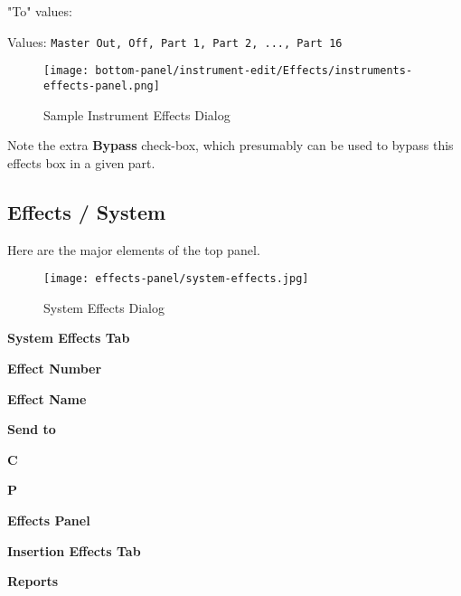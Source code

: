    "To" values:

   Values: \texttt{Master Out, Off, Part 1, Part 2, ..., Part 16}


\begin{figure}[H]
   \centering 
   \texttt{[image: bottom-panel/instrument-edit/Effects/instruments-effects-panel.png]}
   \caption{Sample Instrument Effects Dialog}
   \label{fig:sample_instrument_effects_dialog}
\end{figure}

   Note the extra \textbf{Bypass} check-box, which presumably can be used to
   bypass this effects box in a given part.

%
%

\subsection{Effects / System}
\label{subsec:effects_system}

   Here are the major elements of the top panel.

\begin{figure}[H]
   \centering 
   \texttt{[image: effects-panel/system-effects.jpg]}
   \caption{System Effects Dialog}
   \label{fig:system_effects_dialog}
\end{figure}

   \begin{enumber}
      \item \textbf{System Effects Tab}
      \item \textbf{Effect Number}
      \item \textbf{Effect Name}
      \item \textbf{Send to}
      \item \textbf{C}
      \item \textbf{P}
      \item \textbf{Effects Panel}
      \item \textbf{Insertion Effects Tab}
      \item \textbf{Reports}
   \end{enumber}

